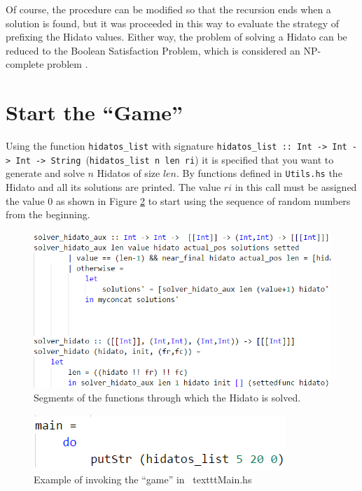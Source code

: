 \documentclass{llncs}
\begin{document}
Of course, the procedure can be modified so that the recursion ends when a solution is found, but it was proceeded in this way to evaluate the strategy of prefixing the Hidato values. Either way, the problem of solving a Hidato can be reduced to the Boolean Satisfaction Problem, which is considered an NP-complete problem \cite{serio}.

\section{Start the ``Game''}
Using the function \texttt{hidatos\_list} with signature \texttt{hidatos\_list :: Int -> Int -> Int -> String}~(\texttt{hidatos\_list n len ri}) it is specified that you want to generate and solve $n$ Hidatos of size $len$.
By functions defined in \texttt{Utils.hs} the Hidato and all its solutions are printed. The value $ri$ in this call must be assigned the value $0$ as shown in Figure \ref{main} to start using the sequence of random numbers from the beginning.

\begin{figure}
\begin{center}
\includegraphics[width= 1\columnwidth]{figuras/solver}
\end{center}
\caption{Segments of the functions through which the Hidato is solved.}
\label{solver}
\end{figure}

\begin{figure}
\begin{center}
\includegraphics[width= .5\columnwidth]{figuras/main}
\end{center}
\caption{Example of invoking the ``game'' in \ texttt{Main.hs}}
\label{main}
\end{figure}
\end{document}
